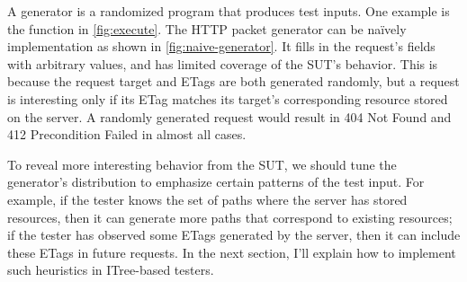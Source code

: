 A generator is a randomized program that produces test inputs.  One example is
the  function in \autoref{fig:execute}.  The HTTP packet
generator can be na\"ively implementation as shown in
\autoref{fig:naive-generator}.  It fills in the request's fields with arbitrary
values, and has limited coverage of the SUT's behavior.  This is because the
request target and ETags are both generated randomly, but a request is
interesting only if its ETag matches its target's corresponding resource stored
on the server.  A randomly generated request would result in 404 Not Found and
412 Precondition Failed in almost all cases.

To reveal more interesting behavior from the SUT, we should tune the generator's
distribution to emphasize certain patterns of the test input.  For example, if
the tester knows the set of paths where the server has stored resources, then it
can generate more paths that correspond to existing resources; if the tester has
observed some ETags generated by the server, then it can include these ETags in
future requests.  In the next section, I'll explain how to implement such
heuristics in ITree-based testers.
